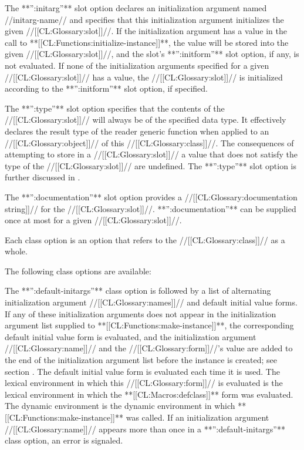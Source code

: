 \itemitem{\bull} The **'':initarg''** slot option declares an initialization argument named //initarg-name// and specifies that this initialization argument initializes the given //[[CL:Glossary:slot]]//. If the initialization argument has a value in the call to **[[CL:Functions:initialize-instance]]**, the value will be stored into the given //[[CL:Glossary:slot]]//, and the slot's **'':initform''** slot option, if any, is not evaluated. If none of the initialization arguments specified for a given //[[CL:Glossary:slot]]// has a value, the //[[CL:Glossary:slot]]// is initialized according to the **'':initform''** slot option, if specified.

\itemitem{\bull} The **'':type''** slot option specifies that the contents of the //[[CL:Glossary:slot]]// will always be of the specified data type. It effectively declares the result type of the reader generic function when applied to an //[[CL:Glossary:object]]// of this //[[CL:Glossary:class]]//. The consequences of attempting to store in a //[[CL:Glossary:slot]]// a value that does not satisfy the type of the //[[CL:Glossary:slot]]// are undefined. The **'':type''** slot option is further discussed in \secref\SlotInheritance.

\itemitem{\bull} The **'':documentation''** slot option provides a //[[CL:Glossary:documentation string]]// for the //[[CL:Glossary:slot]]//. **'':documentation''** can be supplied once at most for a given //[[CL:Glossary:slot]]//.  \endlist

Each class option is an option that refers to the //[[CL:Glossary:class]]// as a whole.

The following class options are available:

\beginlist \itemitem{\bull} The **'':default-initargs''** class option is followed by a list of alternating initialization argument //[[CL:Glossary:names]]// and default initial value forms. If any of these initialization arguments does not appear in the initialization argument list supplied to **[[CL:Functions:make-instance]]**, the corresponding default initial value form is evaluated, and the initialization argument //[[CL:Glossary:name]]// and the //[[CL:Glossary:form]]//'s value are added to the end of the initialization argument list before the instance is created; see section {\secref\ObjectCreationAndInit}. The default initial value form is evaluated each time it is used. The lexical environment in which this //[[CL:Glossary:form]]// is evaluated is the lexical environment in which the **[[CL:Macros:defclass]]** form was evaluated. The dynamic environment is the dynamic environment in which **[[CL:Functions:make-instance]]** was called. If an initialization argument //[[CL:Glossary:name]]// appears more than once in a **'':default-initargs''** class option, an error is signaled.

